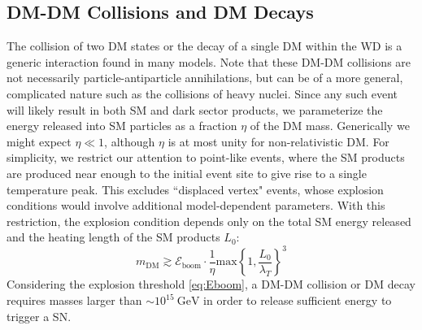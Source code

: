 \documentclass[twocolumn,showpacs,preprintnumbers,amsmath,amssymb,prd]{revtex4}
\newcommand{\GeV}{\text{GeV}}
\begin{document}
\subsection{DM-DM Collisions and DM Decays}
\label{sec:coldecay}
The collision of two DM states or the decay of a single DM within the WD is a generic interaction found in many models.
Note that these DM-DM collisions are not necessarily particle-antiparticle annihilations, but can be of a more general, complicated nature such as the collisions of heavy nuclei.
Since any such event will likely result in both SM and dark sector products, we parameterize the energy released into SM particles as a fraction $\eta$ of the DM mass.
Generically we might expect $\eta \ll 1$, although $\eta$ is at most unity for non-relativistic DM.
For simplicity, we restrict our attention to point-like events, where the SM products are produced near enough to the initial event site to give rise to a single temperature peak.
This excludes ``displaced vertex" events, whose explosion conditions would involve additional model-dependent parameters.
With this restriction, the explosion condition depends only on the total SM energy released and the heating length of the SM products $L_0$:
\begin{equation}
\label{eq:coldecay}
    m_\text{DM} \gtrsim \mathcal{E}_\text{boom} \cdot \frac{1}{\eta}
      \text{max}\left\{1, \frac{L_0}{\lambda_T}\right\}^3
\end{equation}
Considering the explosion threshold \eqref{eq:Eboom}, a DM-DM collision or DM decay requires masses larger than $\sim 10^{15} ~\GeV$ in order to release sufficient energy to trigger a SN.
\end{document}
